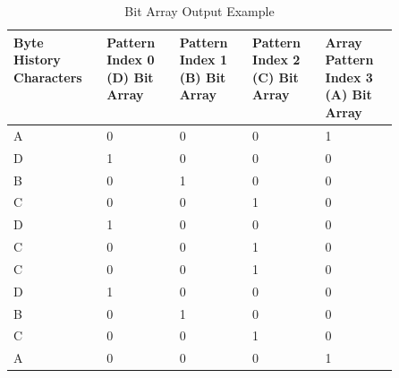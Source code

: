 \documentclass[doublespace,nopageskip]{VTthesis}
\begin{document}
\begin{table}[htb]
	\centering
	\caption{Bit Array Output Example}
	\begin{tabular}{p{0.1\linewidth}p{0.1\linewidth}p{0.1\linewidth}p{0.1\linewidth}p{0.1\linewidth}}
	    \toprule
	    Byte History Characters & Pattern Index 0 (D) Bit Array & Pattern Index 1 (B) Bit Array & Pattern Index 2 (C) Bit Array & Array Pattern Index 3 (A) Bit Array\\
	    \midrule
	    A & 0 & 0 & 0 & 1\\
	    \midrule
	    D & 1 & 0 & 0 & 0\\
	    \midrule
	    B & 0 & 1 & 0 & 0\\
	    \midrule
	    C & 0 & 0 & 1 & 0\\
	    \midrule
	    D & 1 & 0 & 0 & 0\\
	    \midrule
	    C & 0 & 0 & 1 & 0\\
	    \midrule
	    C & 0 & 0 & 1 & 0\\
	    \midrule
	    D & 1 & 0 & 0 & 0\\
	    \midrule
	    B & 0 & 1 & 0 & 0\\
	    \midrule
	    C & 0 & 0 & 1 & 0\\
	    \midrule
	    A & 0 & 0 & 0 & 1\\
	    \bottomrule
	\end{tabular}
	\label{tab:bit_array_output_example}
\end{table}
\end{document}
